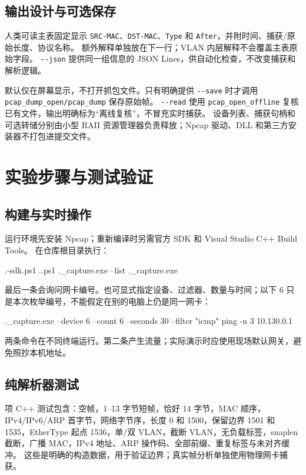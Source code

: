 \documentclass[UTF8,notitlepage,11pt]{ctexart}
\newcommand{\src}[1]{\nolinkurl{#1}}
\begin{document}
\subsection{输出设计与可选保存}
人类可读主表固定显示 \src{SRC-MAC}、\src{DST-MAC}、\src{Type} 和 \src{After}，并附时间、捕获/原始长度、协议名称。
额外解释单独放在下一行；VLAN 内层解释不会覆盖主表原始字段。
\src{--json} 提供同一组信息的 JSON Lines，供自动化检查，不改变捕获和解析逻辑。

默认仅在屏幕显示，不打开抓包文件。只有明确提供 \src{--save} 时才调用 \src{pcap_dump_open/pcap_dump} 保存原始帧。
\src{--read} 使用 \src{pcap_open_offline} 复核已有文件，输出明确标为“离线复核”，不冒充实时捕获。
设备列表、捕获句柄和可选转储分别由小型 RAII 资源管理器负责释放；Npcap 驱动、DLL 和第三方安装器不打包进提交文件。

\section{实验步骤与测试验证}
\subsection{构建与实时操作}
运行环境先安装 Npcap；重新编译时另需官方 SDK 和 Visual Studio C++ Build Tools。
在仓库根目录执行：
\begin{code}
.\bootstrap-sdk.ps1
.\build.ps1
.\bin\packet_capture.exe --list
.\bin\packet_capture.exe
\end{code}
最后一条会询问网卡编号。也可显式指定设备、过滤器、数量与时间；以下 6 只是本次枚举编号，不能假定在别的电脑上仍是同一网卡：
\begin{code}
.\bin\packet_capture.exe --device 6 --count 6 --seconds 30 --filter "icmp"
ping -n 3 10.130.0.1
\end{code}
两条命令在不同终端运行。第二条产生流量；实际演示时应使用现场默认网关，避免照抄本机地址。

\subsection{纯解析器测试}
\ParserTests{} 项 C++ 测试包含：空帧，1--13 字节短帧，恰好 14 字节，MAC 顺序，IPv4/IPv6/ARP 首字节，网络字节序，长度 0 和 1500，保留边界 1501 和 1535，EtherType 起点 1536，单/双 VLAN，截断 VLAN，无负载标签，snaplen 截断，广播 MAC，IPv4 地址、ARP 操作码、全部前缀、重复标签与未对齐缓冲。
这些是明确的构造数据，用于验证边界；真实帧分析单独使用物理网卡捕获。
\end{document}
